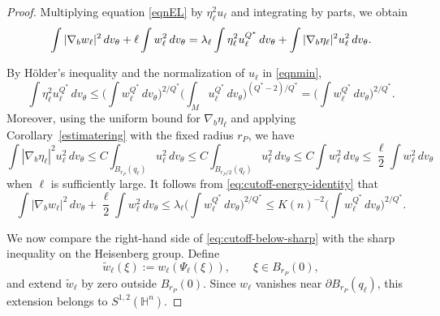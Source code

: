\documentclass[10pt,a4paper]{amsart}
\begin{document}
\begin{proof}
Multiplying equation \eqref{eqnEL}
by \(\eta_\ell^2u_\ell\) and integrating by parts, we obtain
\begin{equation}\label{eq:cutoff-energy-identity}
\int|\nabla_bw_\ell|^2\,dv_\theta
+
\ell\int w_\ell^2\,dv_\theta=
\lambda_\ell
\int\eta_\ell^2u_\ell^{Q^*}\,dv_\theta \\
+
\int|\nabla_b\eta_\ell|^2u_\ell^2\,dv_\theta.
\end{equation}

By H\"older's inequality and the normalization of \(u_\ell\) in \eqref{eqnmin},
\[
\int\eta_\ell^2u_\ell^{Q^*}\,dv_\theta
\le
\Big(\int w_\ell^{Q^*}\,dv_\theta\Big)^{2/Q^*}
\Big(\int_Mu_\ell^{Q^*}\,dv_\theta\Big)^{(Q^*-2)/Q^*}
=
\Big(\int w_\ell^{Q^*}\,dv_\theta\Big)^{2/Q^*}.
\]
Moreover, using the uniform bound for \(\nabla_b\eta_\ell\) and applying Corollary~\ref{estimatering} with the fixed radius \(r_P\), we have
\[
\int|\nabla_b\eta_\ell|^2u_\ell^2\,dv_\theta
\le
C\int_{B_{r_P}(q_\ell)}u_\ell^2\,dv_\theta 
\le
C\int_{B_{r_P/2}(q_\ell)}u_\ell^2\,dv_\theta 
\le
C\int w_\ell^2\,dv_\theta \le \frac{\ell}{2}\int w_\ell^2\,dv_\theta
\]
when \(\ell\) is sufficiently large.
It follows from \eqref{eq:cutoff-energy-identity} that
\begin{equation}\label{eq:cutoff-below-sharp}
\int|\nabla_bw_\ell|^2\,dv_\theta
+
\frac{\ell}{2}\int w_\ell^2\,dv_\theta
\le
\lambda_\ell
\Big(\int w_\ell^{Q^*}\,dv_\theta\Big)^{2/Q^*}\le K(n)^{-2}
\Big(\int w_\ell^{Q^*}\,dv_\theta\Big)^{2/Q^*}.
\end{equation}

We now compare the right-hand side of
\eqref{eq:cutoff-below-sharp} with the sharp inequality on the Heisenberg
group.  Define
\[
\widetilde w_\ell(\xi)
:=
w_\ell(\Psi_\ell(\xi)),
\qquad
\xi\in B_{r_P}(0),
\]
and extend \(\widetilde w_\ell\) by zero outside \(B_{r_P}(0)\).
Since \(w_\ell\) vanishes near \(\partial B_{r_P}(q_\ell)\), this extension
belongs to \(S^{1,2}(\mathbb H^n)\).



\end{proof}
\end{document}
